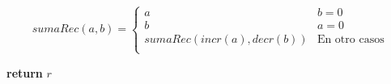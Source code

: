 \documentclass[12pt,letterpaper]{article}
\begin{document}





\[
  sumaRec(a,b) = 
  \begin{cases}
    a & b = 0\\
    b & a = 0\\
    sumaRec(incr(a),decr(b)) & \text{En otro casos} \\
  \end{cases}
\]





\begin{algorithmic}
    \EndWhile
    \State \textbf{return} $r$
    \EndFunction
\end{algorithmic}
\end{document}
